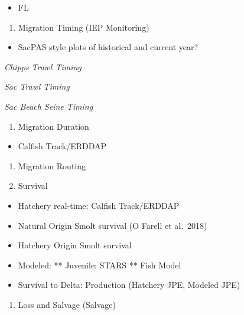 \documentclass[
]{book}
\providecommand{\tightlist}{%
  \setlength{\itemsep}{0pt}\setlength{\parskip}{0pt}}
\theoremstyle{definition}
\theoremstyle{definition}
\theoremstyle{definition}
\theoremstyle{definition}
\theoremstyle{remark}
\begin{document}
\begin{itemize}
\tightlist
\item
  FL
\end{itemize}

\begin{enumerate}
\def\labelenumi{\arabic{enumi}.}
\setcounter{enumi}{2}
\tightlist
\item
  Migration Timing (IEP Monitoring)
\end{enumerate}

\begin{itemize}
\tightlist
\item
  SacPAS style plots of historical and current year?
\end{itemize}

\emph{Chipps Trawl Timing}

\emph{Sac Trawl Timing}

\emph{Sac Beach Seine Timing}

\begin{enumerate}
\def\labelenumi{\arabic{enumi}.}
\setcounter{enumi}{3}
\tightlist
\item
  Migration Duration
\end{enumerate}

\begin{itemize}
\tightlist
\item
  Calfish Track/ERDDAP
\end{itemize}

\begin{enumerate}
\def\labelenumi{\arabic{enumi}.}
\setcounter{enumi}{4}
\item
  Migration Routing
\item
  Survival
\end{enumerate}

\begin{itemize}
\tightlist
\item
  Hatchery real-time: Calfish Track/ERDDAP
\item
  Natural Origin Smolt survival (O Farell et al.~2018)
\item
  Hatchery Origin Smolt survival
\item
  Modeled:
  ** Juvenile: STARS
  ** Fish Model
\item
  Survival to Delta: Production (Hatchery JPE, Modeled JPE)
\end{itemize}

\begin{enumerate}
\def\labelenumi{\arabic{enumi}.}
\setcounter{enumi}{6}
\tightlist
\item
  Loss and Salvage (Salvage)
\end{enumerate}
\end{document}
